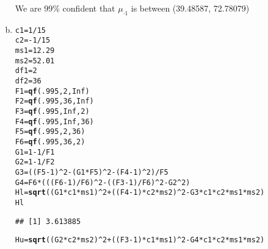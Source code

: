 \documentclass{article}\usepackage[]{graphicx}\usepackage[]{color}
\makeatletter
\newcommand{\hlnum}[1]{\textcolor[rgb]{0.686,0.059,0.569}{#1}}%
\newcommand{\hlopt}[1]{\textcolor[rgb]{0,0,0}{#1}}%
\newcommand{\hlstd}[1]{\textcolor[rgb]{0.345,0.345,0.345}{#1}}%
\newcommand{\hlkwb}[1]{\textcolor[rgb]{0.69,0.353,0.396}{#1}}%
\newcommand{\hlkwd}[1]{\textcolor[rgb]{0.737,0.353,0.396}{\textbf{#1}}}%
\newenvironment{kframe}{%
 \def\at@end@of@kframe{}%
 \ifinner\ifhmode%
  \def\at@end@of@kframe{\end{minipage}}%
  \begin{minipage}{\columnwidth}%
 \fi\fi%
 \def\FrameCommand##1{\hskip\@totalleftmargin \hskip-\fboxsep
 \colorbox{shadecolor}{##1}\hskip-\fboxsep
     \hskip-\linewidth \hskip-\@totalleftmargin \hskip\columnwidth}%
 \MakeFramed {\advance\hsize-\width
   \@totalleftmargin\z@ \linewidth\hsize
   \@setminipage}}%
 {\par\unskip\endMakeFramed%
 \at@end@of@kframe}
\newenvironment{knitrout}{}{} %
\makeatother
\begin{document}
\begin{enumerate}[(a)]
We are 99\% confident that $\mu_{\cdot 1}$ is between (39.48587, 72.78079)

\item

\begin{knitrout}
\color{fgcolor}\begin{kframe}
\begin{alltt}
  \hlstd{c1}\hlkwb{=}\hlnum{1}\hlopt{/}\hlnum{15}
  \hlstd{c2}\hlkwb{=}\hlopt{-}\hlnum{1}\hlopt{/}\hlnum{15}
  \hlstd{ms1}\hlkwb{=}\hlnum{12.29}
  \hlstd{ms2}\hlkwb{=}\hlnum{52.01}
  \hlstd{df1}\hlkwb{=}\hlnum{2}
  \hlstd{df2}\hlkwb{=}\hlnum{36}
  \hlstd{F1}\hlkwb{=}\hlkwd{qf}\hlstd{(}\hlnum{.995}\hlstd{,}\hlnum{2}\hlstd{,}\hlnum{Inf}\hlstd{)}
  \hlstd{F2}\hlkwb{=}\hlkwd{qf}\hlstd{(}\hlnum{.995}\hlstd{,}\hlnum{36}\hlstd{,}\hlnum{Inf}\hlstd{)}
  \hlstd{F3}\hlkwb{=}\hlkwd{qf}\hlstd{(}\hlnum{.995}\hlstd{,}\hlnum{Inf}\hlstd{,}\hlnum{2}\hlstd{)}
  \hlstd{F4}\hlkwb{=}\hlkwd{qf}\hlstd{(}\hlnum{.995}\hlstd{,}\hlnum{Inf}\hlstd{,}\hlnum{36}\hlstd{)}
  \hlstd{F5}\hlkwb{=}\hlkwd{qf}\hlstd{(}\hlnum{.995}\hlstd{,}\hlnum{2}\hlstd{,}\hlnum{36}\hlstd{)}
  \hlstd{F6}\hlkwb{=}\hlkwd{qf}\hlstd{(}\hlnum{.995}\hlstd{,}\hlnum{36}\hlstd{,}\hlnum{2}\hlstd{)}
  \hlstd{G1}\hlkwb{=}\hlnum{1}\hlopt{-}\hlnum{1}\hlopt{/}\hlstd{F1}
  \hlstd{G2}\hlkwb{=}\hlnum{1}\hlopt{-}\hlnum{1}\hlopt{/}\hlstd{F2}
  \hlstd{G3}\hlkwb{=}\hlstd{((F5}\hlopt{-}\hlnum{1}\hlstd{)}\hlopt{^}\hlnum{2}\hlopt{-}\hlstd{(G1}\hlopt{*}\hlstd{F5)}\hlopt{^}\hlnum{2}\hlopt{-}\hlstd{(F4}\hlopt{-}\hlnum{1}\hlstd{)}\hlopt{^}\hlnum{2}\hlstd{)}\hlopt{/}\hlstd{F5}
  \hlstd{G4}\hlkwb{=}\hlstd{F6}\hlopt{*}\hlstd{( ((F6}\hlopt{-}\hlnum{1}\hlstd{)}\hlopt{/}\hlstd{F6)}\hlopt{^}\hlnum{2} \hlopt{-} \hlstd{((F3}\hlopt{-}\hlnum{1}\hlstd{)}\hlopt{/}\hlstd{F6)}\hlopt{^}\hlnum{2} \hlopt{-} \hlstd{G2}\hlopt{^}\hlnum{2} \hlstd{)}
  \hlstd{Hl} \hlkwb{=} \hlkwd{sqrt}\hlstd{( (G1}\hlopt{*}\hlstd{c1}\hlopt{*}\hlstd{ms1)}\hlopt{^}\hlnum{2} \hlopt{+} \hlstd{((F4}\hlopt{-}\hlnum{1}\hlstd{)}\hlopt{*}\hlstd{c2}\hlopt{*}\hlstd{ms2)}\hlopt{^}\hlnum{2} \hlopt{-} \hlstd{G3}\hlopt{*}\hlstd{c1}\hlopt{*}\hlstd{c2}\hlopt{*}\hlstd{ms1}\hlopt{*}\hlstd{ms2)}
  \hlstd{Hl}
\end{alltt}
\begin{verbatim}
## [1] 3.613885
\end{verbatim}
\begin{alltt}
  \hlstd{Hu} \hlkwb{=} \hlkwd{sqrt}\hlstd{( (G2}\hlopt{*}\hlstd{c2}\hlopt{*}\hlstd{ms2)}\hlopt{^}\hlnum{2} \hlopt{+} \hlstd{((F3}\hlopt{-}\hlnum{1}\hlstd{)}\hlopt{*}\hlstd{c1}\hlopt{*}\hlstd{ms1)}\hlopt{^}\hlnum{2} \hlopt{-} \hlstd{G4}\hlopt{*}\hlstd{c1}\hlopt{*}\hlstd{c2}\hlopt{*}\hlstd{ms1}\hlopt{*}\hlstd{ms2)}

\end{alltt}
\end{kframe}
\end{knitrout}
\end{enumerate}
\end{document}
